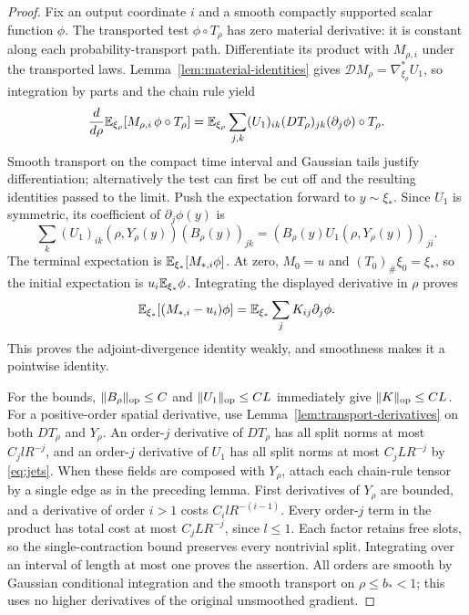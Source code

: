 \begin{proof}
Fix an output coordinate $i$ and a smooth compactly supported scalar
function $\phi$.  The transported test $\phi\circ T_\rho$ has zero
material derivative: it is constant along each probability-transport
path.  Differentiate its product with $M_{\rho,i}$ under the
transported laws.  Lemma~\ref{lem:material-identities} gives
$\mathcal DM_\rho=\nabla_{\xi_\rho}^*U_1$, so integration by parts
and the chain rule yield
\[
 \frac{d}{d\rho}\mathbb E_{\xi_\rho}[M_{\rho,i}\,\phi\circ T_\rho]
 =\mathbb E_{\xi_\rho}\sum_{j,k}(U_1)_{ik}(DT_\rho)_{jk}
                                  (\partial_j\phi)\circ T_\rho.
\]
Smooth transport on the compact time interval and Gaussian tails
justify differentiation; alternatively the test can first be cut off
and the resulting identities passed to the limit.  Push the expectation
forward to $y\sim\xi_*$.  Since $U_1$ is symmetric, its coefficient of
$\partial_j\phi(y)$ is
\[
 \sum_k (U_1)_{ik}(\rho,Y_\rho(y))(B_\rho(y))_{jk}
       =(B_\rho(y)U_1(\rho,Y_\rho(y)))_{ji}.
\]
The terminal expectation is $\mathbb E_{\xi_*}[M_{*,i}\phi]$.
At zero, $M_0=u$ and $(T_0)_\#\xi_0=\xi_*$, so the initial
expectation is $u_i\mathbb E_{\xi_*}\phi$.  Integrating the displayed
derivative in $\rho$ proves
\[
 \mathbb E_{\xi_*}[(M_{*,i}-u_i)\phi]
   =\mathbb E_{\xi_*}\sum_jK_{ij}\partial_j\phi.
\]
This proves the adjoint-divergence identity weakly, and smoothness
makes it a pointwise identity.

For the bounds, $\|B_\rho\|_{\mathrm{op}}\le C$ and
$\|U_1\|_{\mathrm{op}}\le CL$ immediately give $\|K\|_{\mathrm{op}}\le CL$.
For a positive-order spatial derivative, use
Lemma~\ref{lem:transport-derivatives} on both $DT_\rho$ and
$Y_\rho$.  An order-$j$ derivative of $DT_\rho$ has all split norms
at most $C_jlR^{-j}$, and an order-$j$ derivative of $U_1$ has all
split norms at most $C_jLR^{-j}$ by \eqref{eq:jets}.  When these
fields are composed with $Y_\rho$, attach each chain-rule tensor by
a single edge as in the preceding lemma.  First derivatives of
$Y_\rho$ are bounded, and a derivative of order $i>1$ costs
$C_i lR^{-(i-1)}$.  Every order-$j$ term in the product has total
cost at most $C_jLR^{-j}$, since $l\le1$.  Each factor retains free
slots, so the single-contraction bound preserves every nontrivial
split.  Integrating over an interval of length at most one proves
the assertion.  All orders are smooth by Gaussian conditional
integration and the smooth transport on $\rho\le b_*<1$; this uses
no higher derivatives of the original unsmoothed gradient.
\end{proof}

